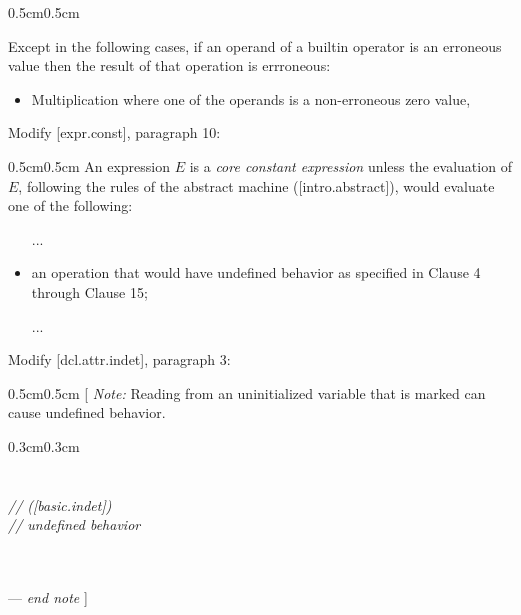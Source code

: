 \begin{adjustwidth}{0.5cm}{0.5cm}
\begin{addedblock}
Except in the following cases, if an operand of a builtin operator
is an erroneous value then the result of that operation is errroneous:
\begin{itemize}
\item Multiplication where one of the operands is a non-erroneous
  zero value,
\end{itemize}
\end{addedblock}
\end{adjustwidth}

Modify [expr.const], paragraph 10:

\begin{adjustwidth}{0.5cm}{0.5cm}
An expression $E$ is a \emph{core constant expression} unless the evaluation of $E$, following the rules of the abstract machine ([intro.abstract]), would evaluate one of the following:
\begin{itemize}
\item [...]
\item an operation that would have undefined behavior as specified in Clause 4 through Clause 15;
\item [...]
\end{itemize}
\end{adjustwidth}

Modify [dcl.attr.indet], paragraph 3:

\begin{adjustwidth}{0.5cm}{0.5cm}
[ \emph{Note:} Reading from an uninitialized variable that is marked \tcode{[[indeterminate]]} can cause undefined behavior.
\begin{adjustwidth}{0.3cm}{0.3cm}
\\
\\
\codetab {}\\
\codetab {} \codelongtab \emph{//  ([basic.indet])}\\
\codetab {} \codelongtab \emph{// undefined behavior}\\
\tcode{\}} \\
\\
\tcode{[...]}
\end{adjustwidth}
--- \emph{end note} ]
\end{adjustwidth}

